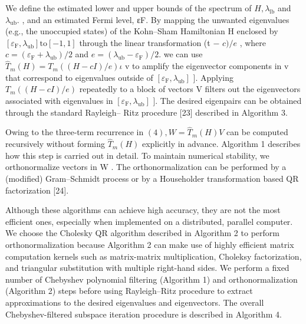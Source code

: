 \documentclass[
  10
]{article}
\begin{document}
We define the estimated lower and upper bounds of the spectrum of
\(H , \lambda _ { \mathrm { l b } }\) and
\(\lambda _ { \mathrm { u b } } .\) , and an estimated Fermi level, εF.
By mapping the unwanted eigenvalues (e.g., the unoccupied states) of the
Kohn--Sham Hamiltonian H enclosed by
\([ \varepsilon _ { \mathrm { F } } , \lambda _ { \mathrm { u b } } ] \mathrm { t o } [ - 1 , 1 ]\)
through the linear transformation (t − \(c ) / e\) , where
\(c = ( \varepsilon _ { \mathrm { F } } + \lambda _ { \mathrm { u b } } ) / 2\)
and
\(e = ( \lambda _ { \mathrm { u b } } - \varepsilon _ { \mathrm { F } } ) / 2 .\)
we can use
\(\hat { T } _ { m } ( H ) = T _ { m } ( ( H - c I ) / e ) \iota\) v to
amplify the eigenvector components in v that correspond to eigenvalues
outside of
\(\left[ \varepsilon _ { \mathrm { F } } , \lambda _ { \mathrm { u b } } \right]\)
{]}. Applying \(T _ { m } ( ( H - c I ) / e )\) repeatedly to a block of
vectors V filters out the eigenvectors associated with eigenvalues in
\(\left[ \varepsilon _ { \mathrm { F } } , \lambda _ { \mathrm { u b } } \right]\)
{]}. The desired eigenpairs can be obtained through the standard
Rayleigh-- Ritz procedure {[}23{]} described in Algorithm 3.

Owing to the three-term recurrence in
\(( 4 ) , W = { \hat { T } } _ { m } ( H ) V\) can be computed
recursively without forming \(\hat { T } _ { m } ( H )\) explicitly in
advance. Algorithm 1 describes how this step is carried out in detail.
To maintain numerical stability, we orthonormalize vectors in W . The
orthonormalization can be performed by a (modified) Gram--Schmidt
process or by a Householder transformation based QR factorization
{[}24{]}.

Although these algorithms can achieve high accuracy, they are not the
most efficient ones, especially when implemented on a distributed,
parallel computer. We choose the Cholesky QR algorithm described in
Algorithm 2 to perform orthonormalization because Algorithm 2 can make
use of highly efficient matrix computation kernels such as matrix-matrix
multiplication, Choleksy factorization, and triangular substitution with
multiple right-hand sides. We perform a fixed number of Chebyshev
polynomial filtering (Algorithm 1) and orthonormalization (Algorithm 2)
steps before using Rayleigh--Ritz procedure to extract approximations to
the desired eigenvalues and eigenvectors. The overall Chebyshev-filtered
subspace iteration procedure is described in Algorithm 4.
\end{document}
